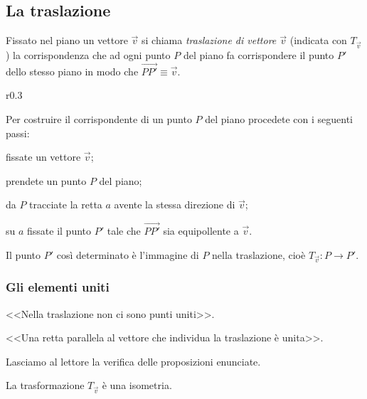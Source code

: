 \subsection{La traslazione}

\begin{definizione}
Fissato nel piano un vettore \(\vec{v}\) si chiama \emph{traslazione di 
vettore \(\vec{v}\)} (indicata con \(T_{\vec{v}}\)) la corrispondenza che 
ad ogni punto \(P\) del piano fa corrispondere il punto \(P'\) dello 
stesso piano in modo che 
\(\overset{\longrightarrow}{PP'}\equiv\vec{v}\).
\end{definizione}

\setlength{\intextsep}{3pt plus 2.0pt minus 2.0pt}
\begin{wrapfigure}{r}{0.3\textwidth}
	\centering
\end{wrapfigure}
Per costruire il corrispondente di un punto \(P\) del piano procedete 
con i seguenti passi:
\begin{enumerate*}
\item fissate un vettore \(\vec{v}\);
\item prendete un punto \(P\) del piano;
\item da \(P\) tracciate la retta \(a\) avente la stessa direzione di 
\(\vec{v}\);
\item su \(a\) fissate il punto \(P'\) tale che \(\overrightarrow{PP'}\) 
sia equipollente a \(\vec{v}\).
\end{enumerate*}
Il punto \(P'\) così determinato è l'immagine di \(P\) nella traslazione, 
cioè \(T_{\vec{v}}:P\rightarrow P'\).

\subsubsection{Gli elementi uniti}

\begin{itemize*}
\item <<Nella traslazione non ci sono punti uniti>>.
\item <<Una retta parallela al vettore che individua la traslazione è 
unita>>.
\end{itemize*}

Lasciamo al lettore la verifica delle proposizioni enunciate.

\begin{teorema}
La trasformazione \(T_{\vec{v}}\) è una isometria.
\end{teorema}

